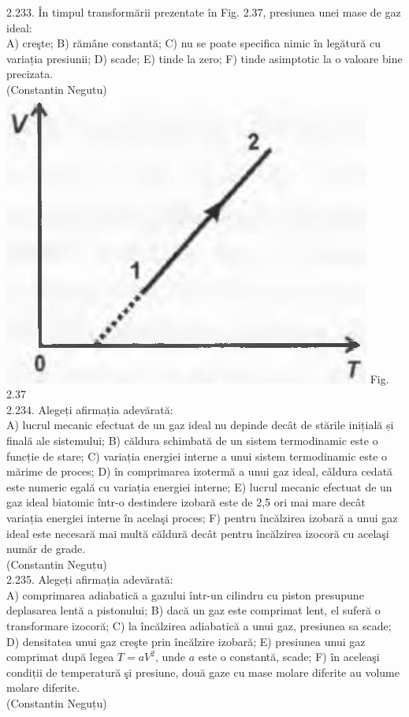 \documentclass[10pt]{article}
\begin{document}
2.233. În timpul transformării prezentate în Fig. 2.37, presiunea unei mase de gaz ideal:\\ A) creşte; B) rămâne constantă; C) nu se poate specifica nimic în legătură cu variația presiunii; D) scade; E) tinde la zero; F) tinde asimptotic la o valoare bine precizata.\\ (Constantin Negutu)\\ \includegraphics[max width=\textwidth, center]{2025_07_01_5b3ff9fa0d508c8e9f17g-126} Fig. 2.37\\

2.234. Alegeți afirmația adevărată:\\ A) lucrul mecanic efectuat de un gaz ideal nu depinde decât de stările inițială și finală ale sistemului; B) căldura schimbată de un sistem termodinamic este o funcție de stare; C) variația energiei interne a unui sistem termodinamic este o mărime de proces; D) în comprimarea izotermă a unui gaz ideal, cǎldura cedată este numeric egală cu variația energiei interne; E) lucrul mecanic efectuat de un gaz ideal biatomic într-o destindere izobară este de 2,5 ori mai mare decât variația energiei interne în acelaşi proces; F) pentru încălzirea izobară a unui gaz ideal este necesară mai multă căldură decât pentru încălzirea izocoră cu acelaşi număr de grade.\\ (Constantin Neguțu)\\

2.235. Alegeți afirmația adevărată:\\ A) comprimarea adiabatică a gazului într-un cilindru cu piston presupune deplasarea lentă a pistonului; B) dacă un gaz este comprimat lent, el suferă o transformare izocoră; C) la încălzirea adiabatică a unui gaz, presiunea sa scade; D) densitatea unui gaz creşte prin încălzire izobară; E) presiunea unui gaz comprimat după legea $T=a V^{2}$, unde $a$ este o constantă, scade; F) în aceleaşi condiții de temperatură şi presiune, două gaze cu mase molare diferite au volume molare diferite.\\ (Constantin Neguțu)\\
\end{document}
